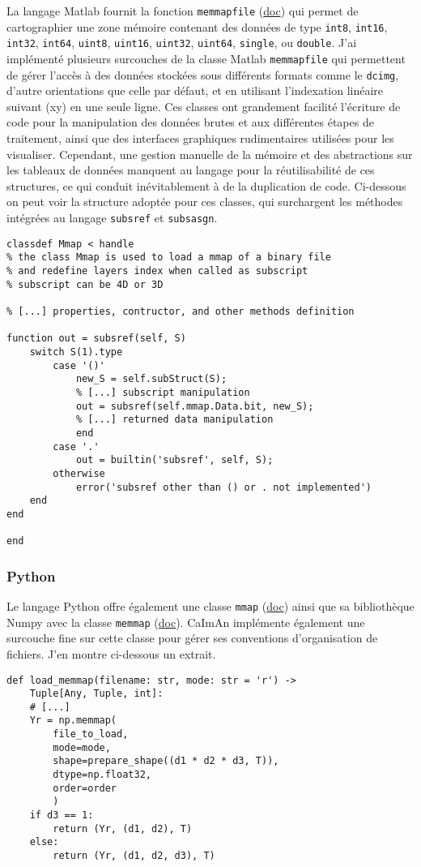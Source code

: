 La langage Matlab fournit la fonction \verb|memmapfile| (\href{https://fr.mathworks.com/help/matlab/ref/memmapfile.html}{doc}) qui permet de cartographier une zone mémoire contenant des données de type \verb|int8|, \verb|int16|, \verb|int32|, \verb|int64|, \verb|uint8|, \verb|uint16|, \verb|uint32|, \verb|uint64|, \verb|single|, ou \verb|double|.
J'ai implémenté plusieurs surcouches de la classe Matlab \verb|memmapfile| qui permettent de gérer l'accès à des données stockées sous différents formats comme le \verb|dcimg|, d'autre orientations que celle par défaut, et en utilisant l'indexation linéaire suivant (xy) en une seule ligne. Ces classes ont grandement facilité l'écriture de code pour la manipulation des données brutes et aux différentes étapes de traitement, ainsi que des interfaces graphiques rudimentaires utilisées pour les visualiser. 
Cependant, une gestion manuelle de la mémoire et des abstractions sur les tableaux de données manquent au langage pour la réutilisabilité de ces structures, ce qui conduit inévitablement à de la duplication de code. Ci-dessous on peut voir la structure adoptée pour ces classes, qui surchargent les méthodes intégrées au langage \verb|subsref| et \verb|subsasgn|.


\matlabstyle
\begin{lstlisting}
classdef Mmap < handle
% the class Mmap is used to load a mmap of a binary file
% and redefine layers index when called as subscript
% subscript can be 4D or 3D

% [...] properties, contructor, and other methods definition

function out = subsref(self, S)        
    switch S(1).type
        case '()'
            new_S = self.subStruct(S);
            % [...] subscript manipulation
            out = subsref(self.mmap.Data.bit, new_S);
            % [...] returned data manipulation
            end
        case '.'
            out = builtin('subsref', self, S);
        otherwise
            error('subsref other than () or . not implemented')
    end        
end

end
\end{lstlisting}

\subsubsection{Python}

Le langage Python offre également une classe \verb|mmap| (\href{https://docs.python.org/3.8/library/mmap.html}{doc}) ainsi que sa bibliothèque Numpy avec la classe \verb|memmap| (\href{https://numpy.org/devdocs/reference/generated/numpy.memmap.html}{doc}). CaImAn implémente également une surcouche fine sur cette classe pour gérer ses conventions d'organisation de fichiers. J'en montre ci-dessous un extrait.

\pythonstyle
\begin{lstlisting}
def load_memmap(filename: str, mode: str = 'r') ->
    Tuple[Any, Tuple, int]:
    # [...]
    Yr = np.memmap(
        file_to_load,
        mode=mode,
        shape=prepare_shape((d1 * d2 * d3, T)),
        dtype=np.float32,
        order=order
        )
    if d3 == 1:
        return (Yr, (d1, d2), T)
    else:
        return (Yr, (d1, d2, d3), T)
\end{lstlisting}
